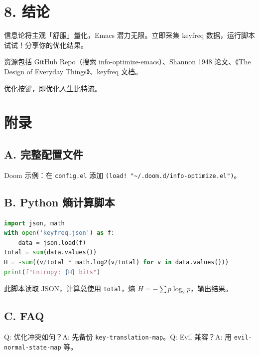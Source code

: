 \chapter{8. 结论}
信息论将主观「舒服」量化，Emacs 潜力无限。立即采集 keyfreq 数据，运行脚本试试！分享你的优化结果。\par
资源包括 GitHub Repo（搜索 info-optimize-emacs）、Shannon 1948 论文、《The Design of Everyday Things》、keyfreq 文档。\par
优化按键，即优化人生比特流。\par
\chapter{附录}
\section{A. 完整配置文件}
Doom 示例：在 \texttt{config.el} 添加 \texttt{(load! "\~{}/.doom.d/info-optimize.el")}。\par
\section{B. Python 熵计算脚本}
\begin{lstlisting}[language=python]
import json, math
with open('keyfreq.json') as f:
    data = json.load(f)
total = sum(data.values())
H = -sum((v/total * math.log2(v/total) for v in data.values()))
print(f"Entropy: {H} bits")
\end{lstlisting}
此脚本读取 JSON，计算总使用 \texttt{total}，熵 $H = -\sum p \log _2 p$，输出结果。\par
\section{C. FAQ}
Q: 优化冲突如何？A: 先备份 \texttt{key-translation-map}。Q: Evil 兼容？A: 用 \texttt{evil-normal-state-map} 等。\par
